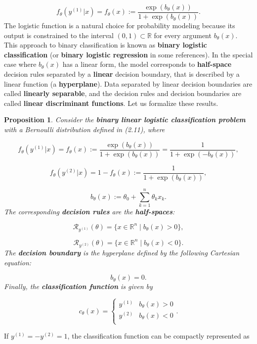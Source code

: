 \documentclass{report}
\newtheorem{proposition}{Proposition}[chapter]
\begin{document}
\begin{equation}
f_\theta(y^{(1)}|x) = f_\theta(x) := \frac{\exp (b_\theta(x))}{1+\exp (b_\theta(x))}.
\end{equation}
The logistic function is a natural choice for probability modeling because its output is constrained to the interval $(0, 1) \subset \mathbb{R}$ for every argument $b_\theta(x)$. This approach to binary classification is known as \textbf{binary logistic classification} (or \textbf{binary logistic regression} in some references). In the special case where $b_\theta(x)$ has a linear form, the model corresponds to \textbf{half-space} decision rules separated by a \textbf{linear} decision boundary, that is described by a linear function (a \textbf{hyperplane}). Data separated by linear decision boundaries are called \textbf{linearly separable}, and the decision rules and decision boundaries are called \textbf{linear discriminant functions}. Let us formalize these results.

\begin{proposition}
Consider the \textbf{binary linear logistic classification problem} with a Bernoulli distribution defined in (2.11), where

\begin{equation}
f_\theta(y^{(1)}|x) = f_\theta(x) := \frac{\exp(b_\theta(x))}{1+\exp(b_\theta(x))} = \frac{1}{1+\exp(-b_\theta(x))},
\end{equation}

\begin{equation}
f_\theta(y^{(2)}|x) = 1- f_\theta(x) := \frac{1}{1+\exp(b_\theta(x))},
\end{equation}

\begin{equation}
b_\theta(x) := \theta_0 + \sum_{k=1}^{n}\theta_kx_k.
\end{equation}
The corresponding \textbf{decision rules} are the \textbf{half-spaces}:

\begin{equation}
\mathcal{R}_{y^{(1)}}(\theta) = \{x \in \mathbb{R}^n \mid b_\theta(x) > 0 \},
\end{equation}

\begin{equation}
\mathcal{R}_{y^{(2)}}(\theta) = \{x \in \mathbb{R}^n \mid b_\theta(x) < 0 \}.
\end{equation}
The \textbf{decision boundary} is the hyperplane defined by the following Cartesian equation:

\begin{equation}
b_\theta(x) = 0.
\end{equation}
Finally, the \textbf{classification function} is given by

\begin{equation}
c_\theta(x) = \left\{\begin{matrix}
y^{(1)} & b_\theta(x) > 0\\
y^{(2)} & b_\theta(x) < 0\\
\end{matrix}\right..
\end{equation}
\end{proposition}
If $y^{(1)} = -y^{(2)} = 1$, the classification function can be compactly represented as
\end{document}
